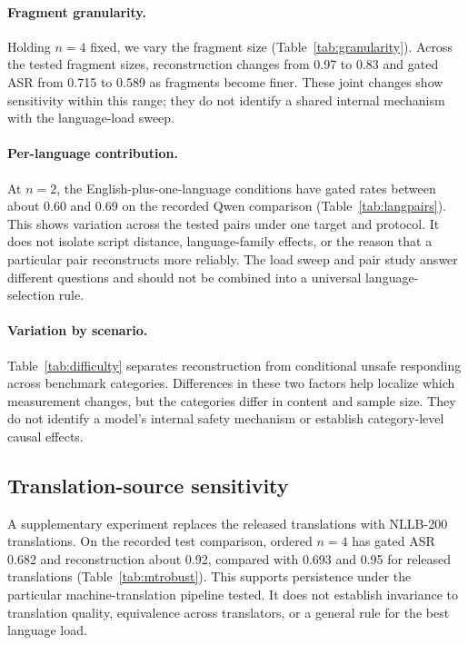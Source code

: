 \documentclass{article}
\begin{document}
\paragraph{Fragment granularity.}
Holding $n{=}4$ fixed, we vary the fragment size (Table~\ref{tab:granularity}).
Across the tested fragment sizes, reconstruction changes from 0.97 to 0.83
and gated ASR from 0.715 to 0.589 as fragments become finer. These joint changes
show sensitivity within this range; they do not identify a shared internal
mechanism with the language-load sweep.

\paragraph{Per-language contribution.}
At $n=2$, the English-plus-one-language conditions have gated rates between about
0.60 and 0.69 on the recorded Qwen comparison (Table~\ref{tab:langpairs}). This
shows variation across the tested pairs under one target and protocol. It does not
isolate script distance, language-family effects, or the reason that a particular
pair reconstructs more reliably. The load sweep and pair study answer different
questions and should not be combined into a universal language-selection rule.

\paragraph{Variation by scenario.}
Table~\ref{tab:difficulty} separates reconstruction from conditional unsafe
responding across benchmark categories. Differences in these two factors help
localize which measurement changes, but the categories differ in content and
sample size. They do not identify a model's internal safety mechanism or establish
category-level causal effects.


\subsection{Translation-source sensitivity}
\label{sec:mtrobust}
A supplementary experiment replaces the released translations with NLLB-200
translations. On the recorded test comparison, ordered $n=4$ has gated ASR 0.682
and reconstruction about 0.92, compared with 0.693 and 0.95 for released
translations (Table~\ref{tab:mtrobust}). This supports persistence under the
particular machine-translation pipeline tested. It does not establish invariance
to translation quality, equivalence across translators, or a general rule for the
best language load.
\end{document}
